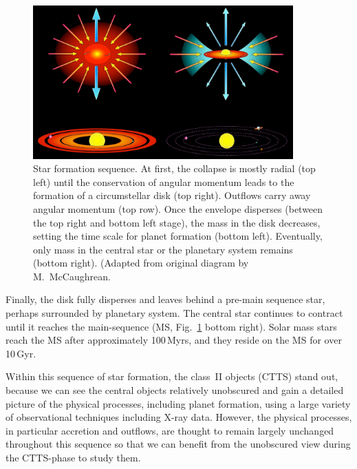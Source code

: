 \begin{figure}[t]
\centering
\includegraphics[width=10cm]{figs/starform_classes.png}
\caption{Star formation sequence. At first, the collapse is mostly radial (top left) until the conservation of angular momentum leads to the formation of a circumstellar disk (top right). Outflows carry away angular momentum (top row). Once the envelope disperses (between the top right and bottom left stage), the mass in the disk decreases, setting the time scale for planet formation (bottom left). Eventually, only mass in the central star or the planetary system remains (bottom right). (Adapted from original diagram by M.~McCaughrean. \label{fig:starform_classes}}
\end{figure}

Finally, the disk fully disperses and leaves behind a pre-main sequence star, perhaps surrounded by planetary system. The central star continues to contract until it reaches the main-sequence (MS, Fig.~\ref{fig:starform_classes} bottom right). Solar mass stars reach the MS after approximately 100\,Myrs, and they reside on the MS for over 10\,Gyr.

Within this sequence of star formation, the class~II objects (CTTS) stand out, because we can see the central objects relatively unobscured and gain a detailed picture of the physical processes, including planet formation, using a large variety of observational techniques including X-ray data. However, the physical processes, in particular accretion and outflows, are thought to remain largely unchanged throughout this sequence so that we can benefit from the unobscured view during the CTTS-phase to study them.

